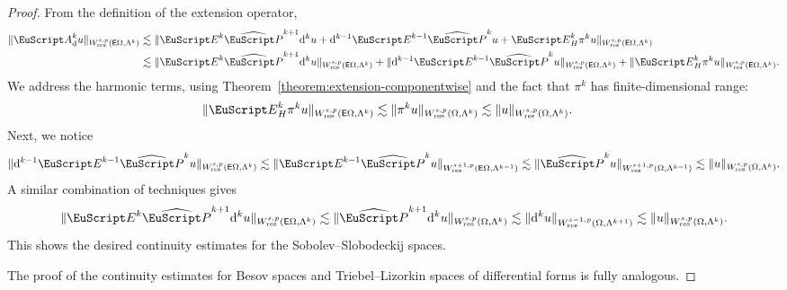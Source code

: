 \documentclass[10pt,a4paper]{amsart}
\theoremstyle{definition}
\theoremstyle{remark}
\numberwithin{equation}{section}
\newcommand{\euA}{{\EuScript A}}
\newcommand{\euE}{{\EuScript E}}
\newcommand{\euP}{{\EuScript P}}
\newcommand{\sfE}{{\mathsf E}}
\newcommand{\cartan}{{\mathrm d}}
\newcommand{\Domain}{{\Omega}}
\newcommand{\extDomain}{{\sfE\Omega}}
\newcommand{\Alt}[1]{\Lambda^{#1}}
\newcommand{\Proj}{\pi}
\newcommand{\Poincare}{\euP}
\newcommand{\Extension}{\euE}
\newcommand{\kommErweiterung}{\euA_{\cartan}}
\newcommand{\Wres}{W_{\mathrm{res}}}
\begin{document}
\begin{proof}
    From the definition of the extension operator, 
    \begin{align*}
        \| \kommErweiterung^{k} u \|_{\Wres^{s,p}(\extDomain,\Alt{k})}
        &
        \lesssim 
        \| 
            \Extension^{k} \widehat\Poincare^{k+1} \cartan^{k} u
            + 
            \cartan^{k-1} \Extension^{k-1} \widehat\Poincare^{k} u
            + 
            \Extension_{H}^{k} \Proj^{k} u 
        \|_{\Wres^{s,p}(\extDomain,\Alt{k})}
        \\&
        \lesssim
        \| \Extension^{k} \widehat\Poincare^{k+1} \cartan^{k} u \|_{\Wres^{s,p}(\extDomain,\Alt{k})}
        + 
        \| \cartan^{k-1} \Extension^{k-1} \widehat\Poincare^{k} u \|_{\Wres^{s,p}(\extDomain,\Alt{k})}
        +
        \| \Extension_{H}^{k} \Proj^{k} u \|_{\Wres^{s,p}(\extDomain,\Alt{k})}
        .
    \end{align*}
    We address the harmonic terms, using Theorem~\ref{theorem:extension-componentwise} and the fact that $\Proj^{k}$ has finite-dimensional range:
    \begin{align*}
        &
        \| \Extension_{H}^{k} \Proj^{k} u \|_{\Wres^{s,p}(\extDomain,\Alt{k})}
        \lesssim
        \| \Proj^{k} u \|_{\Wres^{s,p}(\Domain,\Alt{k})}
        \lesssim
        \| u \|_{\Wres^{s,p}(\Domain,\Alt{k})}
        .
    \end{align*}
    Next, we notice 
    \begin{align*}
        \| \cartan^{k-1} \Extension^{k-1} \widehat\Poincare^{k} u \|_{\Wres^{s,p}(\extDomain,\Alt{k})}
        \lesssim
        \| \Extension^{k-1} \widehat\Poincare^{k} u \|_{\Wres^{s+1,p}(\extDomain,\Alt{k-1})}
        \lesssim
        \| \widehat\Poincare^{k} u \|_{\Wres^{s+1,p}(\Domain,\Alt{k-1})}
        \lesssim
        \| u \|_{\Wres^{s,p}(\Domain,\Alt{k})}
        .
    \end{align*}
    A similar combination of techniques gives 
    \begin{align*}
        \| \Extension^{k} \widehat\Poincare^{k+1} \cartan^{k} u \|_{\Wres^{s,p}(\extDomain,\Alt{k})}
        \lesssim
        \| \widehat\Poincare^{k+1} \cartan^{k} u \|_{\Wres^{s,p}(\Domain,\Alt{k})}
        \lesssim
        \| \cartan^{k} u \|_{\Wres^{s-1,p}(\Domain,\Alt{k+1})}
        \lesssim
        \| u \|_{\Wres^{s,p}(\Domain,\Alt{k})}
        .
    \end{align*}
    This shows the desired continuity estimates for the Sobolev--Slobodeckij spaces. 
    
    The proof of the continuity estimates for Besov spaces and Triebel--Lizorkin spaces of differential forms is fully analogous.
\end{proof}
\end{document}
